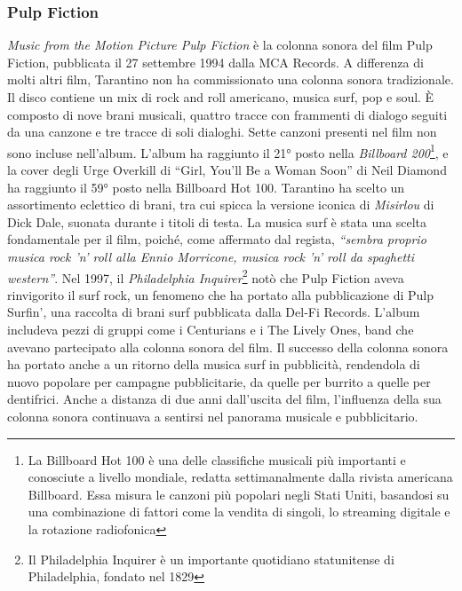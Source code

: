\documentclass[12pt]{article} %
\begin{document}
    \normalsize
    \subsubsection*{Pulp Fiction}
    \begin{flushleft}
        \textit{Music from the Motion Picture Pulp Fiction} è la colonna sonora del film Pulp Fiction, pubblicata il 27 settembre 1994 dalla MCA Records. A differenza di molti altri film, Tarantino non ha commissionato una colonna sonora tradizionale. Il disco contiene un mix di rock and roll americano, musica surf, pop e soul. È composto di nove brani musicali, quattro tracce con frammenti di dialogo seguiti da una canzone e tre tracce di soli dialoghi. Sette canzoni presenti nel film non sono incluse nell’album.
        L’album ha raggiunto il 21° posto nella \textit{Billboard 200}\footnote{La Billboard Hot 100 è una delle classifiche musicali più importanti e conosciute a livello mondiale, redatta settimanalmente dalla rivista americana Billboard. Essa misura le canzoni più popolari negli Stati Uniti, basandosi su una combinazione di fattori come la vendita di singoli, lo streaming digitale e la rotazione radiofonica}, e la cover degli Urge Overkill di “Girl, You’ll Be a Woman Soon” di Neil Diamond ha raggiunto il 59° posto nella Billboard Hot 100. 
        Tarantino ha scelto un assortimento eclettico di brani, tra cui spicca la versione iconica di \textit{Misirlou} di Dick Dale, suonata durante i titoli di testa. La musica surf è stata una scelta fondamentale per il film, poiché, come affermato dal regista, \textit{``sembra proprio musica rock 'n’ roll alla Ennio Morricone, musica rock 'n’ roll da spaghetti western”}.
        Nel 1997, il \textit{Philadelphia Inquirer}\footnote{Il Philadelphia Inquirer è un importante quotidiano statunitense di Philadelphia, fondato nel 1829} notò che Pulp Fiction aveva rinvigorito il surf rock, un fenomeno che ha portato alla pubblicazione di Pulp Surfin', una raccolta di brani surf pubblicata dalla Del-Fi Records. L'album includeva pezzi di gruppi come i Centurians e i The Lively Ones, band che avevano partecipato alla colonna sonora del film. Il successo della colonna sonora ha portato anche a un ritorno della musica surf in pubblicità, rendendola di nuovo popolare per campagne pubblicitarie, da quelle per burrito a quelle per dentifrici. 
        Anche a distanza di due anni dall'uscita del film, l'influenza della sua colonna sonora continuava a sentirsi nel panorama musicale e pubblicitario.
    \end{flushleft}
\end{document}
